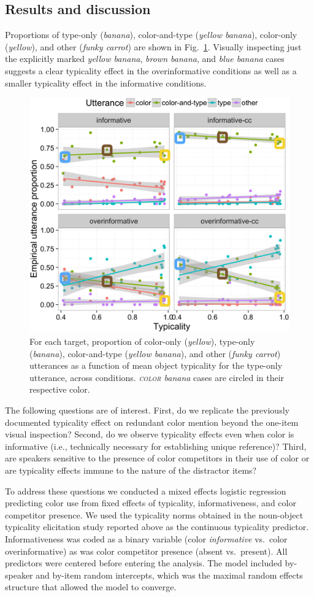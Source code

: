 \documentclass[10pt,letterpaper]{article}
\newcommand{\figref}[1]{Fig.~\ref{#1}}
\begin{document}
\subsection{Results and discussion}

Proportions of type-only (\emph{banana}), color-and-type (\emph{yellow banana}), color-only (\emph{yellow}), and other (\emph{funky carrot}) are shown in \figref{fig:proportions}. Visually inspecting just the explicitly marked \emph{yellow banana}, \emph{brown banana}, and \emph{blue banana} cases suggests a clear typicality effect in the overinformative conditions as well as a smaller typicality effect in the informative conditions. 

\begin{figure}[bt]
\centering
\includegraphics[width=.5\textwidth]{graphs/results1.png}
\caption{For each target, proportion of color-only (\emph{yellow}), type-only (\emph{banana}), color-and-type (\emph{yellow banana}), and other (\emph{funky carrot}) utterances as a function of mean object typicality for the type-only utterance, across conditions. \emph{\textsc{color} banana} cases are circled in their respective color.}
\label{fig:proportions}
\end{figure}

The following questions are of interest. First, do we replicate the previously documented typicality effect on redundant color mention beyond the one-item visual inspection? Second, do we observe typicality effects even when color is informative (i.e., technically necessary for establishing unique reference)? Third, are speakers sensitive to the presence of color competitors in their use of color or are typicality effects immune to the nature of the distractor items?

To address these questions we conducted a mixed effects logistic regression predicting color use from fixed effects of typicality, informativeness, and color competitor presence. We used the typicality norms obtained in the noun-object typicality elicitation study reported above as the continuous typicality predictor. Informativeness was coded as a binary variable (color \emph{informative} vs.~color overinformative) as was color competitor presence (absent vs.~present). All predictors were centered before entering the analysis. The model included by-speaker and by-item random intercepts, which was the maximal random effects structure that allowed the model to converge.
\end{document}
